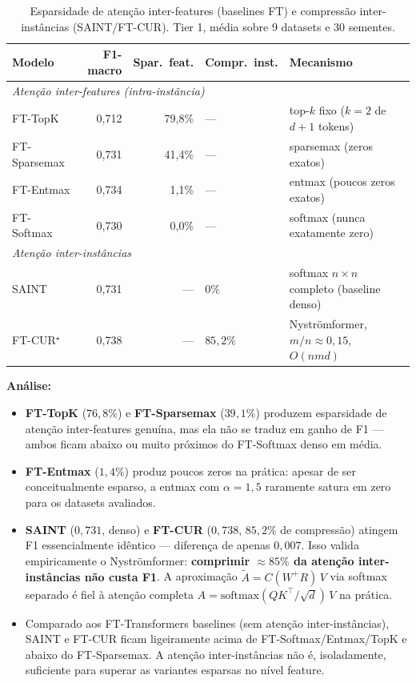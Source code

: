 \documentclass[12pt,a4paper]{article}
\begin{document}
\begin{table}[H]
\centering
\caption{Esparsidade de atenção inter-features (baselines FT) e compressão
inter-instâncias (SAINT/FT-CUR). Tier 1, média sobre 9 datasets e 30 sementes.}
\label{tab:sparsity_ft}
\begin{tabular}{lrrll}
\toprule
\textbf{Modelo} & \textbf{F1-macro} & \textbf{Spar.\ feat.} & \textbf{Compr.\ inst.} & \textbf{Mecanismo} \\
\midrule
\multicolumn{5}{l}{\textit{Atenção inter-features (intra-instância)}} \\
FT-TopK      & 0,712 & 79,8\% & --- & top-$k$ fixo ($k{=}2$ de $d{+}1$ tokens) \\
FT-Sparsemax & 0,731 & 41,4\% & --- & sparsemax (zeros exatos) \\
FT-Entmax    & 0,734 &  1,1\% & --- & entmax (poucos zeros exatos) \\
FT-Softmax   & 0,730 &  0,0\% & --- & softmax (nunca exatamente zero) \\
\midrule
\multicolumn{5}{l}{\textit{Atenção inter-instâncias}} \\
SAINT        & 0,731 & --- & $0\%$  & softmax $n{\times}n$ completo (baseline denso) \\
FT-CUR$^\star$ & 0,738 & --- & $85{,}2\%$ & Nyströmformer, $m/n{\approx}0{,}15$, $O(nmd)$ \\
\bottomrule
\end{tabular}
\end{table}

\textbf{Análise:}
\begin{itemize}
  \item \textbf{FT-TopK} ($76{,}8\%$) e \textbf{FT-Sparsemax} ($39{,}1\%$) produzem
        esparsidade de atenção inter-features genuína, mas ela não se traduz em ganho
        de F1 --- ambos ficam abaixo ou muito próximos do FT-Softmax denso em média.
  \item \textbf{FT-Entmax} ($1{,}4\%$) produz poucos zeros na prática: apesar de
        ser conceitualmente esparso, a entmax com $\alpha{=}1{,}5$ raramente satura
        em zero para os datasets avaliados.
  \item \textbf{SAINT} ($0{,}731$, denso) e \textbf{FT-CUR} ($0{,}738$, $85{,}2\%$
        de compressão) atingem F1 essencialmente idêntico --- diferença de apenas
        $0{,}007$. Isso valida empiricamente o Nyströmformer: \textbf{comprimir
        $\approx 85\%$ da atenção inter-instâncias não custa F1}. A aproximação
        $\tilde A = C(W^+ R)\,V$ via softmax separado é fiel à atenção completa
        $A = \text{softmax}(QK^\top/\sqrt d)\,V$ na prática.
  \item Comparado aos FT-Transformers baselines (sem atenção inter-instâncias),
        SAINT e FT-CUR ficam ligeiramente acima de FT-Softmax/Entmax/TopK e abaixo
        do FT-Sparsemax. A atenção inter-instâncias não é, isoladamente, suficiente
        para superar as variantes esparsas no nível feature.
\end{itemize}
\end{document}
